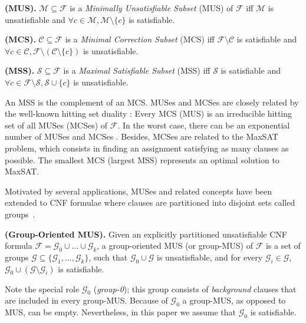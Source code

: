 \documentclass{llncs}
\newcommand{\fml}[1]{{\mathcal{#1}}}
\newcommand{\set}[1]{\{ #1 \}}
\begin{document}
\begin{definition} \label{def:mus}
\textbf{(MUS).} $ \fml{M}\subseteq\fml{F}$ is a {\em Minimally Unsatisfiable Subset}
(MUS) of $\fml{F}$ iff $\fml{M}$ is unsatisfiable and
$\forall{c\in\fml{M}}, \fml{M}\setminus\{ c \}$ is satisfiable.
\end{definition}
\begin{definition} \label{def:mcs}
\textbf{(MCS).} $\fml{C}\subseteq\fml{F}$ is a {\em Minimal Correction Subset} (MCS)
iff $\fml{F} \setminus \fml{C}$ is satisfiable and
$\forall{c\in\fml{C}}, \fml{F} \setminus (\fml{C}\setminus\{ c \})$
is unsatisfiable.
\end{definition}
\begin{definition} \label{def:mss}
\textbf{(MSS).} $\fml{S}\subseteq\fml{F}$ is a {\em Maximal Satisfiable Subset} (MSS)
iff $\fml{S}$ is satisfiable and
$\forall{c\in\fml{F}\setminus\fml{S}}, \fml{S}\cup\{c\}$ is
unsatisfiable.
\end{definition}

An MSS is the complement of an MCS. MUSes and MCSes are closely related by the well-known hitting set duality \cite{reiter-aij87,stuckey-padl05,lozinskii-jetai03,slaney-ecai14}: Every MCS (MUS) is an irreducible hitting set of all MUSes (MCSes) of  $\fml{F}$. In the worst case, there can be an exponential number of MUSes and MCSes \cite{liffiton-jar08,osullivan-aaai07}. Besides, MCSes are related to the MaxSAT problem, which consists in finding an assignment satisfying as many clauses as possible. The smallest MCS (largest MSS) represents an optimal solution to MaxSAT.

Motivated by several applications, MUSes and related concepts have
been extended to CNF formulae where clauses are partitioned into
disjoint sets called groups~\cite{liffiton-jar08}.

\begin{definition} \label{def:gmus}
\textbf{(Group-Oriented MUS).} Given an explicitly partitioned unsatisfiable CNF formula $\fml{F} = \fml{G}_0 \cup ... \cup \fml{G}_k$, a group-oriented MUS (or group-MUS) of $\fml{F}$ is a set of groups $ \fml{G} \subseteq \set{ \fml{G}_1, ... , \fml{G}_k }$, such that $\fml{G}_0 \cup \fml{G}$ is unsatisfiable, and for every $\fml{G}_i \in \fml{G}$, $\fml{G}_0 \cup (\fml{G} \setminus \fml{G}_i)$ is satisfiable.
\end{definition}

Note the special role $\fml{G}_0$ (\textit{group-0}); this group consists of \textit{background} clauses that are included in every group-MUS. Because of $\fml{G}_0$ a group-MUS, as opposed to MUS, can be empty. Nevertheless, in this paper we assume that $\fml{G}_0$ is satisfiable.
\end{document}
